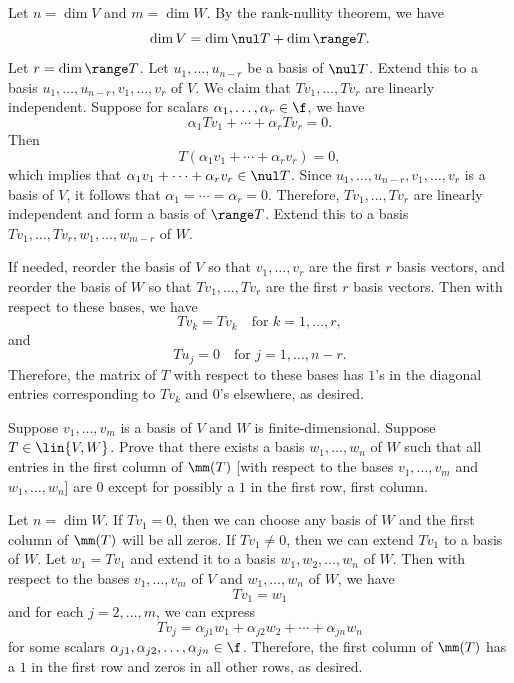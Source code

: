\begin{sol}
    Let $n = \dim V$ and $m = \dim W$. By the rank-nullity theorem, we have
    \[\dim V = \dim \nul T + \dim \range T.\]
    Let $r = \dim \range T$. Let $u_1, \ldots, u_{n - r}$ be a basis of $\nul T$. Extend this to a basis $u_1, \ldots, u_{n - r}, v_1, \ldots, v_r$ of $V$. We claim that $Tv_1, \ldots, Tv_r$ are linearly independent. Suppose for scalars $\alpha_1, \ldots, \alpha_r \in \f$, we have
    \[\alpha_1 Tv_1 + \cdots + \alpha_r Tv_r = 0.\]
    Then
    \[T(\alpha_1 v_1 + \cdots + \alpha_r v_r) = 0,\]
    which implies that $\alpha_1 v_1 + \cdots + \alpha_r v_r \in \nul T$. Since $u_1, \ldots, u_{n - r}, v_1, \ldots, v_r$ is a basis of $V$, it follows that $\alpha_1 = \cdots = \alpha_r = 0$. Therefore, $Tv_1, \ldots, Tv_r$ are linearly independent and form a basis of $\range T$. Extend this to a basis $Tv_1, \ldots, Tv_r, w_1, \ldots, w_{m - r}$ of $W$.

    If needed, reorder the basis of $V$ so that $v_1, \ldots, v_r$ are the first $r$ basis vectors, and reorder the basis of $W$ so that $Tv_1, \ldots, Tv_r$ are the first $r$ basis vectors. Then with respect to these bases, we have
    \[Tv_k = Tv_k \quad \text{for } k = 1, \ldots, r,\]
    and
    \[Tu_j = 0 \quad \text{for } j = 1, \ldots, n - r.\]
    Therefore, the matrix of $T$ with respect to these bases has $1$'s in the diagonal entries corresponding to $Tv_k$ and $0$'s elsewhere, as desired.
\end{sol}

\begin{exercise}[3c6]
    Suppose $v_1, \ldots, v_m$ is a basis of $V$ and $W$ is finite-dimensional. Suppose $T \in \lin{V, W}$. Prove that there exists a basis $w_1, \ldots, w_n$ of $W$ such that all entries in the first column of $\mm(T)$ [with respect to the bases $v_1, \ldots, v_m$ and $w_1, \ldots, w_n$] are $0$ except for possibly a $1$ in the first row, first column.
\end{exercise}

\begin{sol}
    Let $n = \dim W$. If $Tv_1 = 0$, then we can choose any basis of $W$ and the first column of $\mm(T)$ will be all zeros. If $Tv_1 \neq 0$, then we can extend $Tv_1$ to a basis of $W$. Let $w_1 = Tv_1$ and extend it to a basis $w_1, w_2, \ldots, w_n$ of $W$. Then with respect to the bases $v_1, \ldots, v_m$ of $V$ and $w_1, \ldots, w_n$ of $W$, we have
    \[Tv_1 = w_1\]
    and for each $j = 2, \ldots, m$, we can express
    \[Tv_j = \alpha_{j1} w_1 + \alpha_{j2} w_2 + \cdots + \alpha_{jn} w_n\]
    for some scalars $\alpha_{j1}, \alpha_{j2}, \ldots, \alpha_{jn} \in \f$. Therefore, the first column of $\mm(T)$ has a $1$ in the first row and zeros in all other rows, as desired.
\end{sol}

